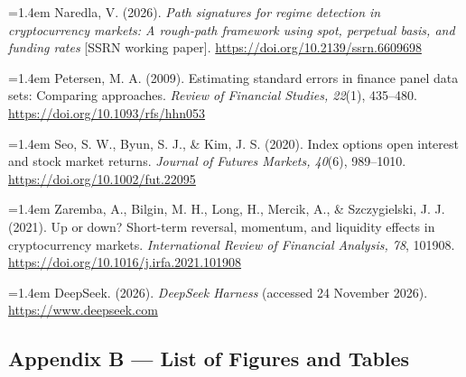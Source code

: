\documentclass[11pt,a4paper]{article}
\begin{document}
{\noindent\hangindent=1.4em Naredla, V. (2026). \emph{Path signatures for regime detection in cryptocurrency markets: A rough-path framework using spot, perpetual basis, and funding rates} [SSRN working paper]. \url{https://doi.org/10.2139/ssrn.6609698}

\noindent\hangindent=1.4em Petersen, M. A. (2009). Estimating standard errors in finance panel data sets: Comparing approaches. \emph{Review of Financial Studies, 22}(1), 435--480. \url{https://doi.org/10.1093/rfs/hhn053}

\noindent\hangindent=1.4em Seo, S. W., Byun, S. J., \& Kim, J. S. (2020). Index options open interest and stock market returns. \emph{Journal of Futures Markets, 40}(6), 989--1010. \url{https://doi.org/10.1002/fut.22095}

\noindent\hangindent=1.4em Zaremba, A., Bilgin, M. H., Long, H., Mercik, A., \& Szczygielski, J. J. (2021). Up or down? Short-term reversal, momentum, and liquidity effects in cryptocurrency markets. \emph{International Review of Financial Analysis, 78}, 101908. \url{https://doi.org/10.1016/j.irfa.2021.101908}

\noindent\hangindent=1.4em DeepSeek. (2026). \emph{DeepSeek Harness} (accessed 24 November 2026). \url{https://www.deepseek.com}

\subsection*{Appendix B --- List of Figures and Tables}

}
\end{document}
